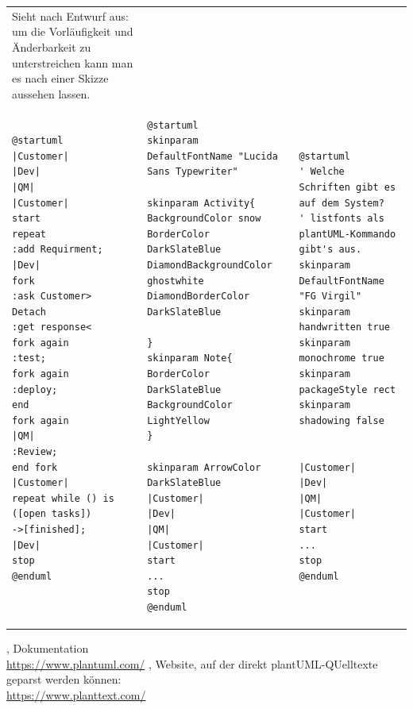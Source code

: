 \documentclass[10pt]{scrartcl}
\begin{document}
\begin{tabular}[b]{p{5.5cm} p{5.5cm} p{5.5cm}}
	Sieht nach Entwurf aus: um die Vorläufigkeit und Änderbarkeit zu unterstreichen kann man es nach einer Skizze aussehen lassen.
	\\
	
	\begin{lstlisting}[style=plantuml]
@startuml
|Customer|
|Dev|
|QM|
|Customer|
start
repeat
:add Requirment;
|Dev|
fork
:ask Customer>
Detach
:get response<
fork again 
:test;
fork again
:deploy;
end
fork again 
|QM|
:Review;
end fork
|Customer|
repeat while () is ([open tasks])
->[finished];
|Dev|
stop 
@enduml
	
	\end{lstlisting}
	&
	\begin{lstlisting}[style=plantuml]
@startuml
skinparam DefaultFontName "Lucida Sans Typewriter"

skinparam Activity{
BackgroundColor snow
BorderColor DarkSlateBlue
DiamondBackgroundColor ghostwhite
DiamondBorderColor DarkSlateBlue

}
skinparam Note{
BorderColor DarkSlateBlue
BackgroundColor LightYellow
}

skinparam ArrowColor DarkSlateBlue
|Customer|
|Dev|
|QM|
|Customer|
start
...
stop 
@enduml
	\end{lstlisting}
	
	&
	
	
	\begin{lstlisting}[style=plantuml]
@startuml
' Welche Schriften gibt es auf dem System?
' listfonts als plantUML-Kommando gibt's aus.
skinparam DefaultFontName "FG Virgil"
skinparam handwritten true
skinparam monochrome true
skinparam packageStyle rect
skinparam shadowing false


|Customer|
|Dev|
|QM|
|Customer|
start
...
stop 
@enduml
	\end{lstlisting}
	
\end{tabular}

\begin{thebibliography}{9}
	,
	Dokumentation \\
	\url{	https://www.plantuml.com/}
	,
	Website, auf der direkt plantUML-QUelltexte geparst werden können: \\\url{https://www.planttext.com/}
\end{thebibliography}
\end{document}
